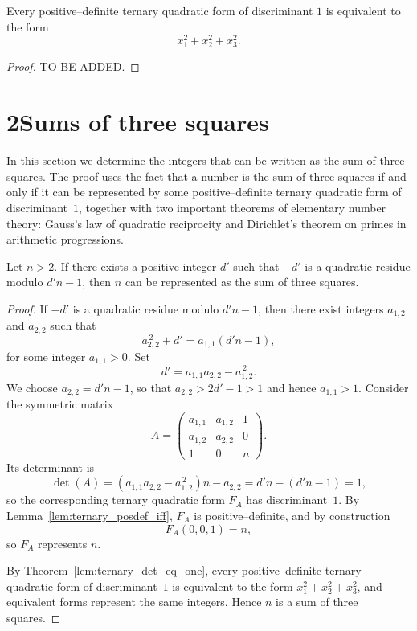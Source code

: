 \begin{lemma}
\label{lem:ternary_det_eq_one}
\leanok 
Every positive–definite ternary quadratic form of discriminant $1$
is equivalent to the form
\[x_1^2 + x_2^2 + x_3^2.
\]
\end{lemma}

\begin{proof}
\leanok
{}
TO BE ADDED.
\end{proof}

\section*{2\quad Sums of three squares}

In this section we determine the integers that can be written as the sum of
three squares. The proof uses the fact that a number is the sum of three squares
if and only if it can be represented by some positive–definite ternary quadratic
form of discriminant~$1$, together with two important theorems of elementary
number theory: Gauss's law of quadratic reciprocity and Dirichlet's theorem on
primes in arithmetic progressions.

\begin{lemma}
\label{lem:three-squares-dprime}
\leanok
Let $n>2$.  If there exists a positive integer $d'$ such that $-d'$ is a
quadratic residue modulo $d'n-1$, then $n$ can be represented as the sum
of three squares.
\end{lemma}

\begin{proof}
\leanok
{}
If $-d'$ is a quadratic residue modulo $d'n-1$, then there exist integers
$a_{1,2}$ and $a_{2,2}$ such that
\[
a_{2,2}^{\,2} + d' = a_{1,1}(d'n-1),
\]
for some integer $a_{1,1}>0$.  Set
\[
d' = a_{1,1}a_{2,2} - a_{1,2}^{\,2}.
\]
We choose $a_{2,2}=d'n-1$, so that $a_{2,2}>2d'-1>1$ and hence $a_{1,1}>1$.
Consider the symmetric matrix
\[
A =
\begin{pmatrix}
 a_{1,1} & a_{1,2} & 1 \\
 a_{1,2} & a_{2,2} & 0 \\
 1       & 0       & n
\end{pmatrix}.
\]
Its determinant is
\[
\det(A) = (a_{1,1}a_{2,2} - a_{1,2}^{\,2})n - a_{2,2}
        = d'n - (d'n-1) = 1,
\]
so the corresponding ternary quadratic form $F_A$ has discriminant~$1$.
By Lemma~\ref{lem:ternary_posdef_iff}, $F_A$ is positive–definite, and by construction
\[
F_A(0,0,1) = n,
\]
so $F_A$ represents $n$.

By Theorem~\ref{lem:ternary_det_eq_one}, every positive–definite ternary quadratic form of
discriminant~$1$ is equivalent to the form $x_1^2 + x_2^2 + x_3^2$, and
equivalent forms represent the same integers.  Hence $n$ is a sum of
three squares.
\end{proof}

